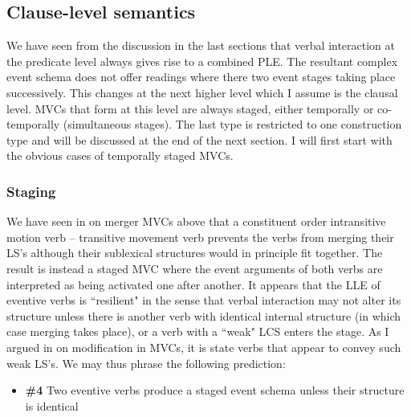 \subsection{Clause-level semantics} \label{sec:clause-level}

We have seen from the discussion in the last sections that verbal interaction at the predicate level always gives rise to a combined PLE. The resultant complex event schema does not offer readings where there two event stages taking place successively. This changes at the next higher level which I assume is the clausal level. MVCs that form at this level are always staged, either temporally or co-temporally (simultaneous stages). The last type is restricted to one construction type and will be discussed at the end of the next section. I will first start with the obvious cases of temporally staged MVCs.

\subsubsection{Staging}\label{sec:staging}

We have seen in  on merger MVCs above that a constituent order intransitive motion verb -- transitive movement verb prevents the verbs from merging their LS's although their sublexical structures would in principle fit together. The result is instead a staged MVC where the event arguments of both verbs are interpreted as being activated one after another. It appears that the LLE of eventive verbs is ``resilient" in the sense that verbal interaction may not alter its structure unless there is another verb with identical internal structure (in which case merging takes place), or a verb with a ``weak" LCS enters the stage. As I argued in  on modification in MVCs, it is state verbs that appear to convey such weak LS's. We may thus phrase the following prediction:

\begin{itemize}
\item \textbf{\#4} Two eventive verbs produce a staged event schema unless their structure is identical
\end{itemize}

